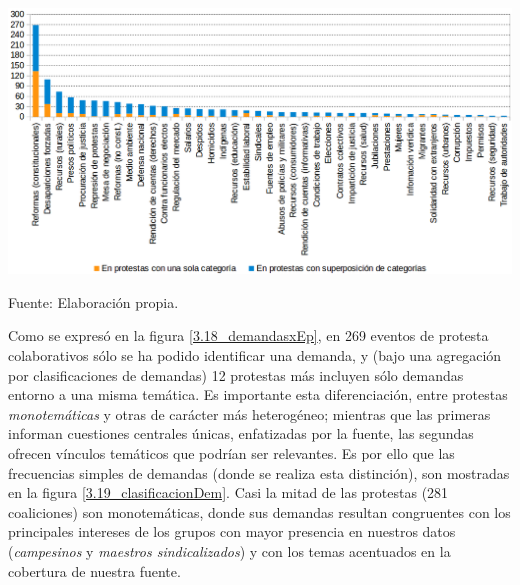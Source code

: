 \documentclass[letterpaper, 11pt]{book}
\theoremstyle{definition}
\theoremstyle{remark}
\begin{document}
\hspace{-1em}\begin{minipage}{\linewidth}
\centering
{} \label{3.19_clasificacionDem}
\hspace{-2em}\includegraphics[scale=0.43]{img/3.19_clasificacionDem.png}
\par\bigskip
\small Fuente: Elaboración propia.
\end{minipage}\bigskip


Como se expresó en la figura \ref{3.18_demandasxEp}, en 269 eventos de protesta colaborativos sólo se ha podido identificar una demanda, y (bajo una agregación por clasificaciones de demandas) 12 protestas más incluyen sólo demandas entorno a una misma temática. 
Es importante esta diferenciación, entre protestas \emph{monotemáticas} y otras de carácter más heterogéneo;  
mientras que las primeras informan cuestiones centrales únicas, enfatizadas por la fuente, las segundas ofrecen vínculos temáticos que podrían ser relevantes. 
Es por ello que las frecuencias simples de demandas (donde se realiza esta distinción), son mostradas en la figura \ref{3.19_clasificacionDem}.
Casi la mitad de las protestas (281 coaliciones) son monotemáticas, donde sus demandas resultan congruentes con los principales intereses de los grupos con mayor presencia en nuestros datos (\emph{campesinos} y \emph{maestros sindicalizados}) y con los temas acentuados en la cobertura de nuestra fuente. 
\end{document}
